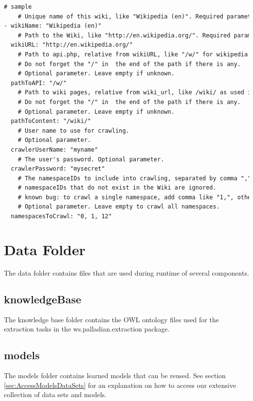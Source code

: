 \documentclass[a4paper,twoside]{book}      %
\begin{document}
\begin{codelisting}
\begin{lstlisting}[caption=MediaWiki crawler configuration.,frame=tb,language=tex,breaklines=true,label=listing:MWCrawler_configA]
# sample
    # Unique name of this wiki, like "Wikipedia (en)". Required parameter.
- wikiName: "Wikipedia (en)"
    # Path to the Wiki, like "http://en.wikipedia.org/". Required parameter.
  wikiURL: "http://en.wikipedia.org/"
    # Path to api.php, relative from wikiURL, like "/w/" for wikipedia. Must not contain the file name api.php.
    # Do not forget the "/" in  the end of the path if there is any.
    # Optional parameter. Leave empty if unknown. 		
  pathToAPI: "/w/" 
    # Path to wiki pages, relative from wiki_url, like /wiki/ as used in wikipedia (resulting path is http://de.wikipedia.org/wiki/).         
    # Do not forget the "/" in  the end of the path if there is any. 
    # Optional parameter. Leave empty if unknown.
  pathToContent: "/wiki/"
    # User name to use for crawling.
    # Optional parameter. 
  crawlerUserName: "myname" 
    # The user's password. Optional parameter. 
  crawlerPassword: "mysecret"
    # The namespaceIDs to include into crawling, separated by comma ",". All pages within these namespaces are crawled.
    # namespaceIDs that do not exist in the Wiki are ignored.
    # known bug: to crawl a single namespace, add comma like "1,", otherwise all namespaces are crawled! 
    # Optional parameter. Leave empty to crawl all namespaces.
  namespacesToCrawl: "0, 1, 12" 
\end{lstlisting}
\end{codelisting}


\section{Data Folder}
The data folder contains files that are used during runtime of several components.

\subsection{knowledgeBase} 
The knowledge base folder contains the OWL ontology files used for the extraction tasks in the ws.palladian.extraction package.

\subsection{models}
The models folder contains learned models that can be reused. See section \ref{sec:AccessModelsDataSets} for an explanation on how to access our extensive collection of data sets and models.
\end{document}
